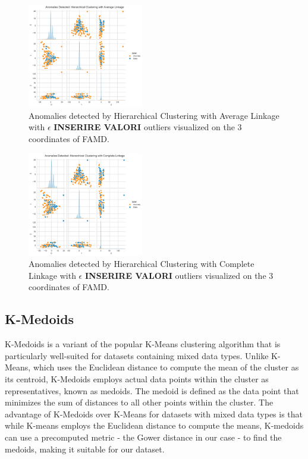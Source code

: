 \documentclass[a4paper]{article}
\begin{document}
\begin{figure}
    \centering
    \includegraphics[width=0.45\textwidth]{images/famd_hierarchical_average_fig.png}
    \caption{Anomalies detected by Hierarchical Clustering with Average Linkage with $\epsilon$ \textbf{INSERIRE VALORI} outliers visualized on the 3 coordinates of FAMD.}
    \label{fig:famd_hierarchical_average_fig}
\end{figure}

\begin{figure}
    \centering
    \includegraphics[width=0.45\textwidth]{images/famd_hierarchical_complete_fig.png}
    \caption{Anomalies detected by Hierarchical Clustering with Complete Linkage with $\epsilon$ \textbf{INSERIRE VALORI} outliers visualized on the 3 coordinates of FAMD.}
    \label{fig:famd_hierarchical_complete_fig}
\end{figure}

\subsection{K-Medoids}
K-Medoids is a variant of the popular K-Means clustering algorithm that is particularly well-suited for datasets containing mixed data types. Unlike K-Means, which uses the Euclidean distance to compute the mean of the cluster as its centroid, K-Medoids employs actual data points within the cluster as representatives, known as medoids. The medoid is defined as the data point that minimizes the sum of distances to all other points within the cluster. \newline
The advantage of K-Medoids over K-Means for datasets with mixed data types is that while K-means employs the Euclidean distance to compute the means, K-medoids can use a precomputed metric - the Gower distance in our case - to find the medoids, making it suitable for our dataset.
\end{document}
